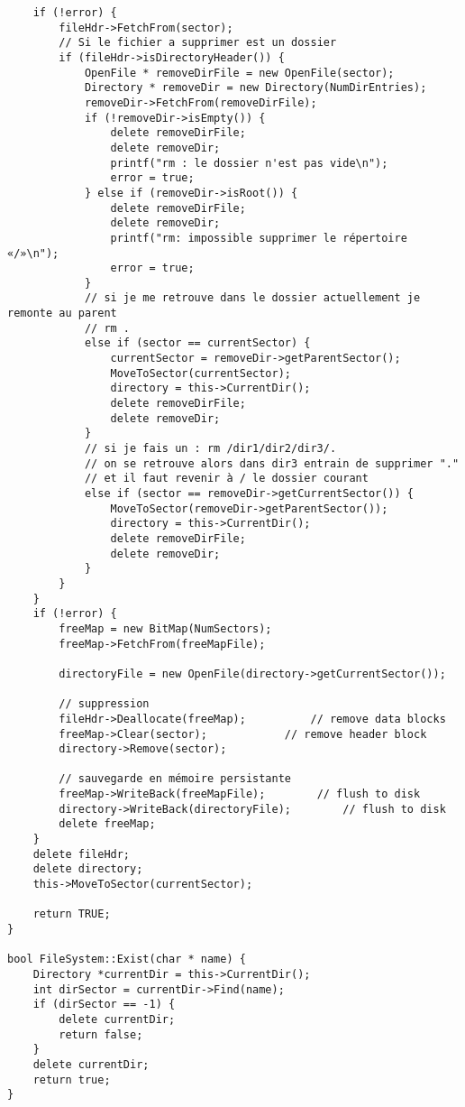 \documentclass[a4paper,10pt]{article}
\begin{document}
\begin{lstlisting}
    if (!error) {
        fileHdr->FetchFrom(sector);
        // Si le fichier a supprimer est un dossier
        if (fileHdr->isDirectoryHeader()) {
            OpenFile * removeDirFile = new OpenFile(sector);
            Directory * removeDir = new Directory(NumDirEntries);
            removeDir->FetchFrom(removeDirFile);
            if (!removeDir->isEmpty()) {
                delete removeDirFile;
                delete removeDir;
                printf("rm : le dossier n'est pas vide\n");
                error = true;
            } else if (removeDir->isRoot()) {
                delete removeDirFile;
                delete removeDir;
                printf("rm: impossible supprimer le répertoire «/»\n");
                error = true;
            }
            // si je me retrouve dans le dossier actuellement je remonte au parent
            // rm .
            else if (sector == currentSector) {
                currentSector = removeDir->getParentSector();
                MoveToSector(currentSector);
                directory = this->CurrentDir();
                delete removeDirFile;
                delete removeDir;
            }
            // si je fais un : rm /dir1/dir2/dir3/.
            // on se retrouve alors dans dir3 entrain de supprimer "."
            // et il faut revenir à / le dossier courant
            else if (sector == removeDir->getCurrentSector()) {
                MoveToSector(removeDir->getParentSector());
                directory = this->CurrentDir();
                delete removeDirFile;
                delete removeDir;
            }
        }
    }
    if (!error) {
        freeMap = new BitMap(NumSectors);
        freeMap->FetchFrom(freeMapFile);

        directoryFile = new OpenFile(directory->getCurrentSector());

        // suppression
        fileHdr->Deallocate(freeMap);          // remove data blocks
        freeMap->Clear(sector);            // remove header block
        directory->Remove(sector);

        // sauvegarde en mémoire persistante
        freeMap->WriteBack(freeMapFile);        // flush to disk
        directory->WriteBack(directoryFile);        // flush to disk
        delete freeMap;
    }
    delete fileHdr;
    delete directory;
    this->MoveToSector(currentSector);

    return TRUE;
}

bool FileSystem::Exist(char * name) {
    Directory *currentDir = this->CurrentDir();
    int dirSector = currentDir->Find(name);
    if (dirSector == -1) {
        delete currentDir;
        return false;
    }
    delete currentDir;
    return true;
}


\end{lstlisting}
\end{document}
